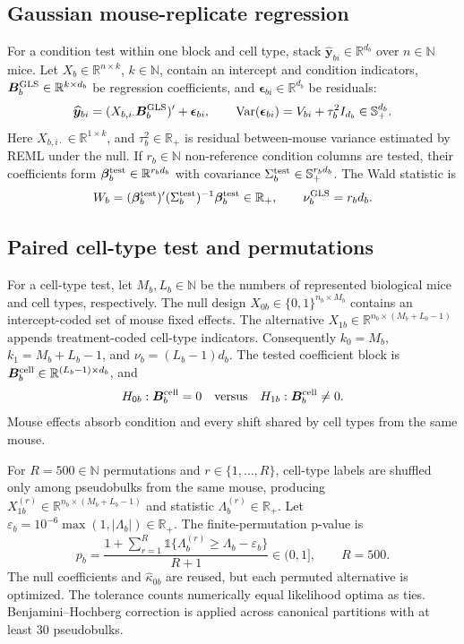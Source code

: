\documentclass[11pt]{article}
\newcommand{\Beta}{\bm B}
\begin{document}
\subsection*{Gaussian mouse-replicate regression}

For a condition test within one block and cell type, stack \(\widehat{\bm y}_{bi}\in\mathbb R^{d_b}\) over \(n\in\mathbb N\) mice. Let \(X_b\in\mathbb R^{n\times k}\), \(k\in\mathbb N\), contain an intercept and condition indicators, \(\Beta_b^{\rm GLS}\in\mathbb R^{k\times d_b}\) be regression coefficients, and \(\bm\epsilon_{bi}\in\mathbb R^{d_b}\) be residuals: \[
 \widehat{\bm y}_{bi}=(X_{b,i\cdot}\Beta_b^{\rm GLS})^\prime
 +\bm\epsilon_{bi},
 \qquad
 \operatorname{Var}(\bm\epsilon_{bi})=
 V_{bi}+\tau_b^2I_{d_b}\in\mathbb S_+^{d_b}.
\]
Here \(X_{b,i\cdot}\in\mathbb R^{1\times k}\), and \(\tau_b^2\in\mathbb R_+\) is residual between-mouse variance estimated by REML under the null. If \(r_b\in\mathbb N\) non-reference condition columns are tested, their coefficients form \(\bm\beta_b^{\rm test}\in\mathbb R^{r_bd_b}\) with covariance \(\Sigma_b^{\rm test}\in\mathbb S_+^{r_bd_b}\). The Wald statistic is \[
 W_b=(\bm\beta_b^{\rm test})^\prime
 (\Sigma_b^{\rm test})^{-1}\bm\beta_b^{\rm test}\in\mathbb R_+,
 \qquad \nu_b^{\rm GLS}=r_bd_b.
\]

\subsection*{Paired cell-type test and permutations}

For a cell-type test, let \(M_b,L_b\in\mathbb N\) be the numbers of represented biological mice and cell types, respectively. The null design \(X_{0b}\in\{0,1\}^{n_b\times M_b}\) contains an intercept-coded set of mouse fixed effects. The alternative \(X_{1b}\in\mathbb R^{n_b\times(M_b+L_b-1)}\) appends treatment-coded cell-type indicators. Consequently \(k_0=M_b\), \(k_1=M_b+L_b-1\), and \(\nu_b=(L_b-1)d_b\). The tested coefficient block is \(\Beta_b^{\rm cell}\in\mathbb R^{(L_b-1)\times d_b}\), and \[
 H_{0b}:\Beta_b^{\rm cell}=0
 \quad\text{versus}\quad
 H_{1b}:\Beta_b^{\rm cell}\neq0.
\]
Mouse effects absorb condition and every shift shared by cell types from the same mouse.

For \(R=500\in\mathbb N\) permutations and \(r\in\{1,\ldots,R\}\), cell-type labels are shuffled only among pseudobulks from the same mouse, producing \(X_{1b}^{(r)}\in\mathbb R^{n_b\times(M_b+L_b-1)}\) and statistic \(\Lambda_b^{(r)}\in\mathbb R_+\). Let \(\varepsilon_b=10^{-6}\max(1,|\Lambda_b|)\in\mathbb R_+\). The finite-permutation p-value is \[
 p_b=\frac{1+\sum_{r=1}^{R}
 \mathbb{1}\{\Lambda_b^{(r)}\geq\Lambda_b-\varepsilon_b\}}{R+1}\in(0,1],
 \qquad R=500.
\]
The null coefficients and \(\widehat\kappa_{0b}\) are reused, but each permuted alternative is optimized. The tolerance counts numerically equal likelihood optima as ties. Benjamini--Hochberg correction is applied across canonical partitions with at least 30 pseudobulks.
\end{document}
